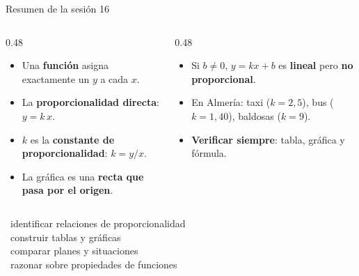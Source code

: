 \documentclass[aspectratio=169, 10pt, spanish]{beamer}
\begin{document}
\begin{frame}{Resumen de la sesión 16}
  \begin{resumenbox}
    \begin{columns}[t]
      \begin{column}{0.48\textwidth}
        \begin{itemize}
          \item Una \textbf{función} asigna exactamente un $y$ a cada $x$.
          \item La \textbf{proporcionalidad directa}: $y = k\,x$.
          \item $k$ es la \textbf{constante de proporcionalidad}: $k = y/x$.
          \item La gráfica es una \textbf{recta que pasa por el origen}.
        \end{itemize}
      \end{column}
      \begin{column}{0.48\textwidth}
        \begin{itemize}
          \item Si $b \neq 0$, $y = kx + b$ es \textbf{lineal} pero \textbf{no proporcional}.
          \item En Almería: taxi ($k=2{,}5$), bus ($k=1{,}40$), baldosas ($k=9$).
          \item \textbf{Verificar siempre}: tabla, gráfica y fórmula.
        \end{itemize}
      \end{column}
    \end{columns}
  \end{resumenbox}

  \vspace{0.3cm}
  \begin{center}
    \ identificar relaciones de proporcionalidad\\[3pt]
    \ construir tablas y gráficas\\[3pt]
    \ comparar planes y situaciones\\[3pt]
    \ razonar sobre propiedades de funciones\\
  \end{center}
\end{frame}
\end{document}
